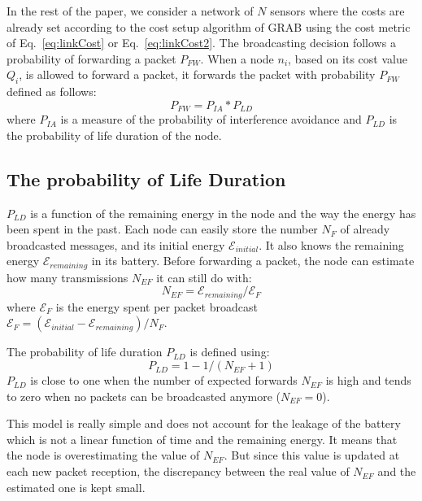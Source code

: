 \documentclass[journal, peerreview, onecolumn, draftcls]{IEEEtran}
\begin{document}
In the rest of the paper, we consider a network of $N$ sensors where the costs are already set according to the cost setup algorithm of GRAB using the cost metric of Eq.~\ref{eq:linkCost} or Eq.~\ref{eq:linkCost2}. The broadcasting decision follows a probability of forwarding a packet $P_{FW}$. When a node $n_i$, based on its cost value $Q_i$, is allowed to forward a packet, it forwards the packet with probability $P_{FW}$ defined as follows:
\begin{equation}\label{eq:pFwd}
    P_{FW} = P_{IA} * P_{LD}
\end{equation}
\noindent where $P_{IA}$ is a measure of the probability of interference avoidance and $P_{LD}$ is the probability of life duration of the node.

\subsection{The probability of Life Duration}

$P_{LD}$ is a function of the remaining energy in the node and the way the energy has been spent in the past. Each node can easily store the number $N_F$ of already broadcasted messages, and its initial energy $\mathcal{E}_{initial}$. It also knows the remaining energy $\mathcal{E}_{remaining}$ in its battery. Before forwarding a packet, the node can estimate how many transmissions $N_{EF}$ it can still do with:
\begin{equation}
N_{EF} = \mathcal{E}_{remaining}/\mathcal{E}_{F}
\end{equation}
\noindent where $\mathcal{E}_F$ is the energy spent per packet broadcast $\mathcal{E}_F = (\mathcal{E}_{initial} - \mathcal{E}_{remaining})/N_F$.

The probability of life duration $P_{LD}$ is defined using:
\begin{equation}\label{eq:PLD2}
P_{LD} = 1 - 1/(N_{EF}+1)
\end{equation}
$P_{LD}$ is close to one when the number of expected forwards $N_{EF}$ is high and tends to zero when no packets can be broadcasted anymore ($N_{EF}=0$).

This model is really simple and does not account for the leakage of the battery which is not a linear function of time and the remaining energy. It means that the node is overestimating the value of $N_{EF}$. But since this value is updated at each new packet reception, the discrepancy between the real value of $N_{EF}$ and the estimated one is kept small.
\end{document}
